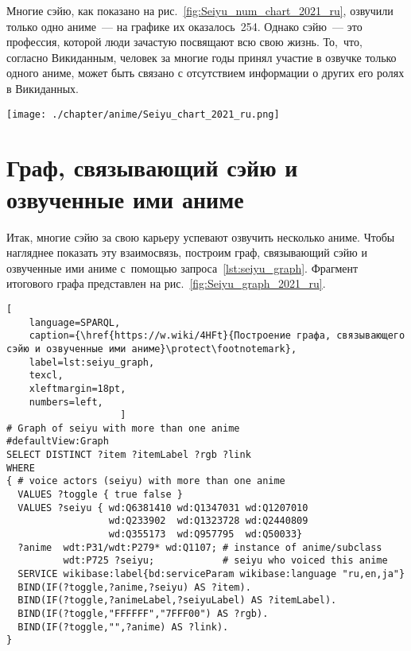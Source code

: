 Многие сэйю, как показано на рис.~\ref{fig:Seiyu_num_chart_2021_ru}, 
озвучили только одно аниме~--- на графике их оказалось~254. 
Однако сэйю~--- это профессия, которой люди зачастую посвящают всю свою жизнь. 
То,~что, согласно Викиданным, человек за многие годы принял участие в озвучке только одного аниме, 
может быть связано с отсутствием информации о других его ролях в Викиданных. 

\begin{figure*}[h]
    \texttt{[image: ./chapter/anime/Seiyu\_chart\_2021\_ru.png]}%
	\caption[График числа ролей, озвученных различными сэйю, 2021 год.]{График числа ролей, озвученных различными сэйю, 2021 год.\\График построен на~основе данных, полученных с~помощью запроса~\protect\ref{lst:seiyu_titles_graph}}%
    \label{fig:Seiyu_num_chart_2021_ru}%
\end{figure*} 




\newpage
\section{Граф, связывающий сэйю и озвученные ими аниме}

Итак, многие сэйю за свою карьеру успевают озвучить несколько аниме. 
Чтобы нагляднее показать эту взаимосвязь, 
построим граф, связывающий сэйю и озвученные ими аниме с~помощью запроса~\ref{lst:seiyu_graph}. 
Фрагмент итогового графа представлен на рис.~\ref{fig:Seiyu_graph_2021_ru}. 


\lstset{numbers=left, firstnumber=1, frame=single, texcl}
\begin{lstlisting}[ 
    language=SPARQL, 
    caption={\href{https://w.wiki/4HFt}{Построение графа, связывающего сэйю и озвученные ими аниме}\protect\footnotemark},
    label=lst:seiyu_graph,
    texcl,
    xleftmargin=18pt, 
    numbers=left,
                    ]
# Graph of seiyu with more than one anime
#defaultView:Graph
SELECT DISTINCT ?item ?itemLabel ?rgb ?link
WHERE
{ # voice actors (seiyu) with more than one anime
  VALUES ?toggle { true false }
  VALUES ?seiyu { wd:Q6381410 wd:Q1347031 wd:Q1207010 
                  wd:Q233902  wd:Q1323728 wd:Q2440809 
                  wd:Q355173  wd:Q957795  wd:Q50033}
  ?anime  wdt:P31/wdt:P279* wd:Q1107; # instance of anime/subclass
          wdt:P725 ?seiyu;            # seiyu who voiced this anime 
  SERVICE wikibase:label{bd:serviceParam wikibase:language "ru,en,ja"}
  BIND(IF(?toggle,?anime,?seiyu) AS ?item).
  BIND(IF(?toggle,?animeLabel,?seiyuLabel) AS ?itemLabel).
  BIND(IF(?toggle,"FFFFFF","7FFF00") AS ?rgb).
  BIND(IF(?toggle,"",?anime) AS ?link).
}
\end{lstlisting}%
\lstset{numbers=none}


